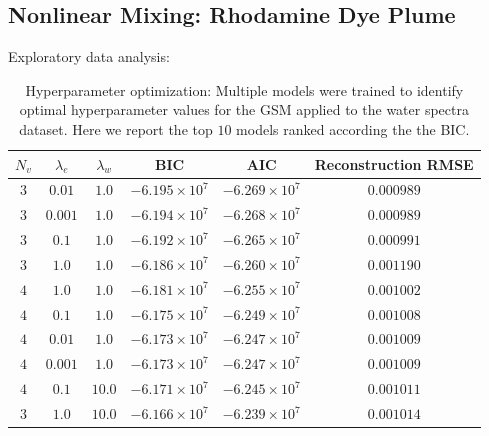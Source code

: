\documentclass[remotesensing,article,submit,pdftex,moreauthors]{Definitions/mdpi}
\begin{document}
\subsection{Nonlinear Mixing: Rhodamine Dye Plume}

Exploratory data analysis: 

\begin{table}[H] 
\caption{Hyperparameter optimization: Multiple models were trained to identify optimal hyperparameter values for the GSM applied to the water spectra dataset. Here we report the top $10$ models ranked according the the BIC.}
\label{table:fit-comparison}
\begin{tabularx}{\textwidth}{CCCCCC}
\toprule
\textbf{$N_v$}	& \textbf{$\lambda_e$}	& \textbf{$\lambda_w$} & \textbf{BIC} & \textbf{AIC} & \textbf{Reconstruction RMSE}\\
\midrule
$3$ & $0.01$    & $1.0$     & $-6.195\times10^7$   & $-6.269\times10^7$   & $0.000989$ \\
$3$	& $0.001$   & $1.0$     & $-6.194\times10^7$   & $-6.268\times10^7$   & $0.000989$ \\
$3$	& $0.1$     & $1.0$	    & $-6.192\times10^7$   & $-6.265\times10^7$   & $0.000991$ \\
$3$	& $1.0$     & $1.0$	    & $-6.186\times10^7$   & $-6.260\times10^7$   & $0.001190$ \\
$4$	& $1.0$     & $1.0$	    & $-6.181\times10^7$   & $-6.255\times10^7$   & $0.001002$ \\
$4$	& $0.1$     & $1.0$	    & $-6.175\times10^7$   & $-6.249\times10^7$   & $0.001008$ \\
$4$	& $0.01$    & $1.0$     & $-6.173\times10^7$   & $-6.247\times10^7$   & $0.001009$ \\ 
$4$	& $0.001$   & $1.0$     & $-6.173\times10^7$   & $-6.247\times10^7$   & $0.001009$ \\
$4$	& $0.1$     & $10.0$    & $-6.171\times10^7$   & $-6.245\times10^7$   & $0.001011$ \\
$3$	& $1.0$     & $10.0$    & $-6.166\times10^7$   & $-6.239\times10^7$   & $0.001014$ \\
\bottomrule
\end{tabularx}
\end{table}
\end{document}
